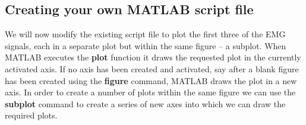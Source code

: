 \documentclass[12pt,a4paper]{article}
\begin{document}
\subsection{Creating your own MATLAB script file}
\label{sec:script}
We will now modify the existing script file to plot the first three of the EMG signals, each in a separate plot but within the same figure – a subplot.  
When MATLAB executes the \textbf{plot} function it draws the requested plot in the currently activated axis.  
If no axis has been created and activated, say after a blank figure has been created using the \textbf{figure} command, MATLAB draws the plot in a new axis.  
In order to create a number of plots within the same figure we can use the \textbf{subplot} command to create a series of new axes into which we can draw the required plots. %
\end{document}
